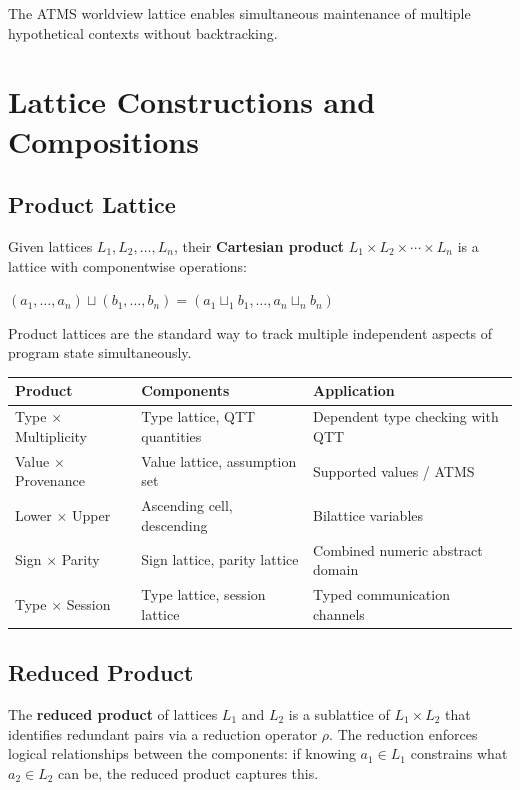\documentclass[11pt]{article}
\begin{document}
The ATMS worldview lattice enables simultaneous maintenance of multiple
hypothetical contexts without backtracking.
\section{Lattice Constructions and Compositions}
\label{sec:orgcce0dac}

\subsection{Product Lattice}
\label{sec:org678aad9}

Given lattices \(L_1, L_2, \ldots, L_n\), their \textbf{Cartesian product} \(L_1 \times
L_2 \times \cdots \times L_n\) is a lattice with componentwise operations:

\((a_1, \ldots, a_n) \sqcup (b_1, \ldots, b_n) = (a_1 \sqcup_1 b_1, \ldots, a_n \sqcup_n b_n)\)

Product lattices are the standard way to track multiple independent aspects of
program state simultaneously.

\begin{center}
\begin{tabular}{lll}
Product & Components & Application\\
\hline
Type \(\times\) Multiplicity & Type lattice, QTT quantities & Dependent type checking with QTT\\
Value \(\times\) Provenance & Value lattice, assumption set & Supported values / ATMS\\
Lower \(\times\) Upper & Ascending cell, descending & Bilattice variables\\
Sign \(\times\) Parity & Sign lattice, parity lattice & Combined numeric abstract domain\\
Type \(\times\) Session & Type lattice, session lattice & Typed communication channels\\
\end{tabular}
\end{center}
\subsection{Reduced Product}
\label{sec:orgd3898d4}

The \textbf{reduced product} of lattices \(L_1\) and \(L_2\) is a sublattice of \(L_1 \times
L_2\) that identifies redundant pairs via a reduction operator \(\rho\). The
reduction enforces logical relationships between the components: if knowing \(a_1
\in L_1\) constrains what \(a_2 \in L_2\) can be, the reduced product captures this.
\end{document}
